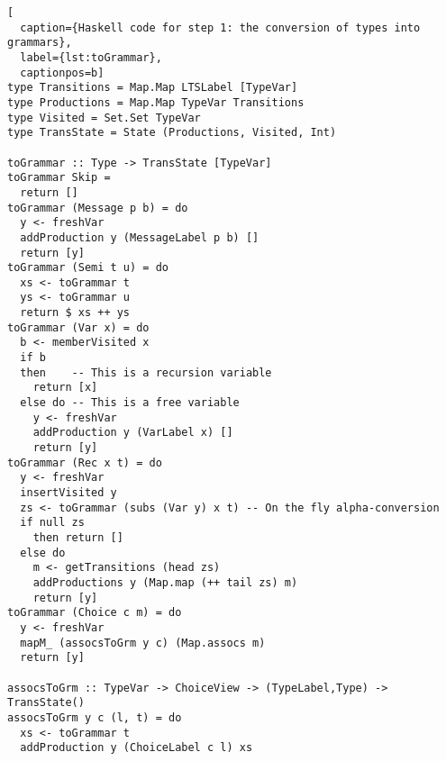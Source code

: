 \begin{lstlisting}[
  caption={Haskell code for step 1: the conversion of types into grammars},
  label={lst:toGrammar},
  captionpos=b]
type Transitions = Map.Map LTSLabel [TypeVar]
type Productions = Map.Map TypeVar Transitions
type Visited = Set.Set TypeVar
type TransState = State (Productions, Visited, Int)

toGrammar :: Type -> TransState [TypeVar]
toGrammar Skip =
  return []
toGrammar (Message p b) = do
  y <- freshVar
  addProduction y (MessageLabel p b) []
  return [y]
toGrammar (Semi t u) = do
  xs <- toGrammar t
  ys <- toGrammar u
  return $ xs ++ ys
toGrammar (Var x) = do
  b <- memberVisited x
  if b
  then    -- This is a recursion variable
    return [x]
  else do -- This is a free variable
    y <- freshVar
    addProduction y (VarLabel x) []
    return [y]
toGrammar (Rec x t) = do
  y <- freshVar
  insertVisited y
  zs <- toGrammar (subs (Var y) x t) -- On the fly alpha-conversion
  if null zs
    then return []
  else do
    m <- getTransitions (head zs)
    addProductions y (Map.map (++ tail zs) m)
    return [y]
toGrammar (Choice c m) = do
  y <- freshVar
  mapM_ (assocsToGrm y c) (Map.assocs m)
  return [y]

assocsToGrm :: TypeVar -> ChoiceView -> (TypeLabel,Type) -> TransState()
assocsToGrm y c (l, t) = do
  xs <- toGrammar t
  addProduction y (ChoiceLabel c l) xs
\end{lstlisting}

